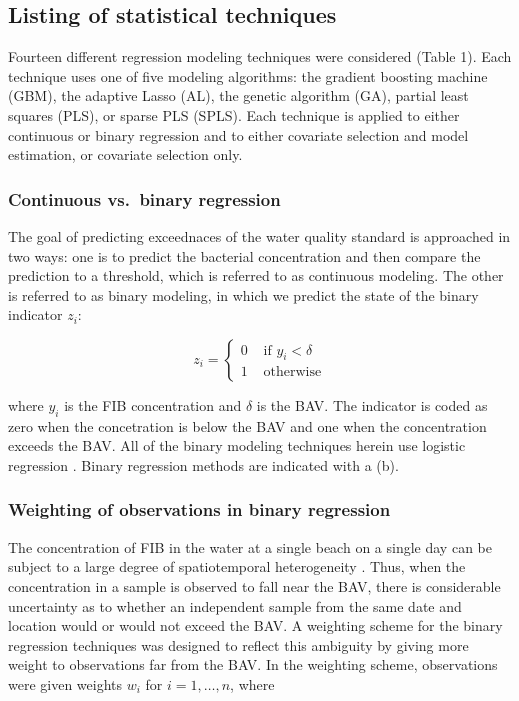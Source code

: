 \documentclass[authoryear,review, 12pt]{elsarticle}
\begin{document}
\subsection{Listing of statistical
techniques}\label{listing-of-statistical-techniques}

Fourteen different regression modeling techniques were considered (Table
1). Each technique uses one of five modeling algorithms: the gradient
boosting machine (GBM), the adaptive Lasso (AL), the genetic algorithm
(GA), partial least squares (PLS), or sparse PLS (SPLS). Each technique
is applied to either continuous or binary regression and to either
covariate selection and model estimation, or covariate selection only.

\subsubsection{Continuous vs.~binary
regression}\label{continuous-vs.binary-regression}

The goal of predicting exceednaces of the water quality standard is
approached in two ways: one is to predict the bacterial concentration
and then compare the prediction to a threshold, which is referred to as
continuous modeling. The other is referred to as binary modeling, in
which we predict the state of the binary indicator \(z_{i}\):

\[ z_{i}=\left\{ \begin{array}{cl}
0 & \text{ if } y_{i} < \delta\\
1 & \text{ otherwise}
\end{array}\right. \]

where \(y_i\) is the FIB concentration and \(\delta\) is the BAV. The
indicator is coded as zero when the concetration is below the BAV and
one when the concentration exceeds the BAV. All of the binary modeling
techniques herein use logistic regression \citep{Hosmer-Lemeshow-2004}.
Binary regression methods are indicated with a (b).

\subsubsection{Weighting of observations in binary
regression}\label{weighting-of-observations-in-binary-regression}

The concentration of FIB in the water at a single beach on a single day
can be subject to a large degree of spatiotemporal heterogeneity
\citep{Whitman:2004pc}. Thus, when the concentration in a sample is
observed to fall near the BAV, there is considerable uncertainty as to
whether an independent sample from the same date and location would or
would not exceed the BAV. A weighting scheme for the binary regression
techniques was designed to reflect this ambiguity by giving more weight
to observations far from the BAV. In the weighting scheme, observations
were given weights \(w_i\) for \(i=1,\dots,n\), where
\end{document}
